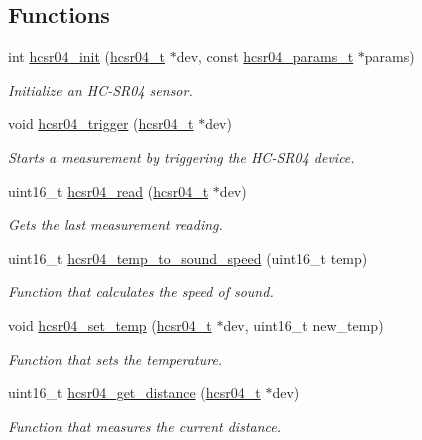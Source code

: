 \subsection*{Functions}
\begin{DoxyCompactItemize}
\item 
int \hyperlink{group__drivers__hcsr04_gabcca3ead68bf012ae42e185e070cb764}{hcsr04\+\_\+init} (\hyperlink{structhcsr04__t}{hcsr04\+\_\+t} $\ast$dev, const \hyperlink{structhcsr04__params__t}{hcsr04\+\_\+params\+\_\+t} $\ast$params)
\begin{DoxyCompactList}\small\item\em Initialize an H\+C-\/\+S\+R04 sensor. \end{DoxyCompactList}\item 
void \hyperlink{group__drivers__hcsr04_gabbfe6e650342e8cc67cf9c9e81b29335}{hcsr04\+\_\+trigger} (\hyperlink{structhcsr04__t}{hcsr04\+\_\+t} $\ast$dev)
\begin{DoxyCompactList}\small\item\em Starts a measurement by triggering the H\+C-\/\+S\+R04 device. \end{DoxyCompactList}\item 
uint16\+\_\+t \hyperlink{group__drivers__hcsr04_ga449b9d4dc30d3d87d9ee4d8936fb592d}{hcsr04\+\_\+read} (\hyperlink{structhcsr04__t}{hcsr04\+\_\+t} $\ast$dev)
\begin{DoxyCompactList}\small\item\em Gets the last measurement reading. \end{DoxyCompactList}\item 
uint16\+\_\+t \hyperlink{group__drivers__hcsr04_ga3b2547facab2613e3113c2fd5d2bd6a8}{hcsr04\+\_\+temp\+\_\+to\+\_\+sound\+\_\+speed} (uint16\+\_\+t temp)
\begin{DoxyCompactList}\small\item\em Function that calculates the speed of sound. \end{DoxyCompactList}\item 
void \hyperlink{group__drivers__hcsr04_gad5a6694b723bb25fc48e7a8750b8a77a}{hcsr04\+\_\+set\+\_\+temp} (\hyperlink{structhcsr04__t}{hcsr04\+\_\+t} $\ast$dev, uint16\+\_\+t new\+\_\+temp)
\begin{DoxyCompactList}\small\item\em Function that sets the temperature. \end{DoxyCompactList}\item 
uint16\+\_\+t \hyperlink{group__drivers__hcsr04_gabef54fa09a72a7aa863aaa03b662125b}{hcsr04\+\_\+get\+\_\+distance} (\hyperlink{structhcsr04__t}{hcsr04\+\_\+t} $\ast$dev)
\begin{DoxyCompactList}\small\item\em Function that measures the current distance. \end{DoxyCompactList}\end{DoxyCompactItemize}


